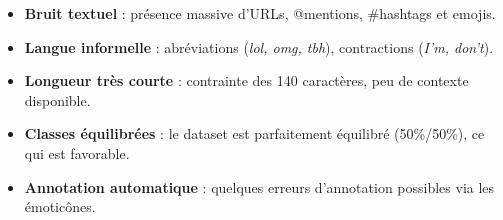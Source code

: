 \begin{itemize}
  \item \textbf{Bruit textuel} : présence massive d'URLs, @mentions, \#hashtags et emojis.
  \item \textbf{Langue informelle} : abréviations (\textit{lol, omg, tbh}), contractions (\textit{I'm, don't}).
  \item \textbf{Longueur très courte} : contrainte des 140 caractères, peu de contexte disponible.
  \item \textbf{Classes équilibrées} : le dataset est parfaitement équilibré (50\%/50\%), ce qui est favorable.
  \item \textbf{Annotation automatique} : quelques erreurs d'annotation possibles via les émoticônes.
\end{itemize}
